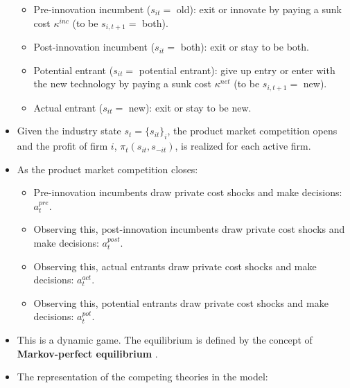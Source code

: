 \documentclass[]{book}
\providecommand{\tightlist}{%
  \setlength{\itemsep}{0pt}\setlength{\parskip}{0pt}}
\begin{document}
\begin{itemize}
  \begin{itemize}
  \tightlist
  \item
    Pre-innovation incumbent (\(s_{it} =\) old): exit or innovate by
    paying a sunk cost \(\kappa^{inc}\) (to be \(s_{i, t + 1} =\) both).
  \item
    Post-innovation incumbent (\(s_{it} =\) both): exit or stay to be
    both.
  \item
    Potential entrant (\(s_{it} =\) potential entrant): give up entry or
    enter with the new technology by paying a sunk cost \(\kappa^{net}\)
    (to be \(s_{i, t + 1} =\) new).
  \item
    Actual entrant (\(s_{it} =\) new): exit or stay to be new.
  \end{itemize}
\item
  Given the industry state \(s_t = \{s_{it}\}_i\), the product market
  competition opens and the profit of firm \(i\),
  \(\pi_t(s_{it}, s_{-it})\), is realized for each active firm.
\item
  As the product market competition closes:

  \begin{itemize}
  \tightlist
  \item
    Pre-innovation incumbents draw private cost shocks and make
    decisions: \(a_t^{pre}\).
  \item
    Observing this, post-innovation incumbents draw private cost shocks
    and make decisions: \(a_t^{post}\).
  \item
    Observing this, actual entrants draw private cost shocks and make
    decisions: \(a_t^{act}\).
  \item
    Observing this, potential entrants draw private cost shocks and make
    decisions: \(a_t^{pot}\).
  \end{itemize}
\item
  This is a dynamic game. The equilibrium is defined by the concept of
  \textbf{Markov-perfect equilibrium} \citep{Maskin1988}.
\item
  The representation of the competing theories in the model:


\end{itemize}
\end{document}
